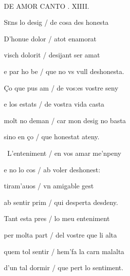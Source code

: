 \documentclass[12pt]{article}
\renewcommand{\espaiAbansEtiquetaPoema}{\vspace{0ex}}
\begin{document}
\begin{estrofa}

\espaiAbansEtiquetaPoema

\\

\begin{rubrica}

\pagina{[20v]} DE AMOR CANTO . XIIII.

\end{rubrica}

\end{estrofa}


\begin{estrofa}

 S\textsc{e}ns lo desig / de cosa des honesta

 D'honue dolor / atot enamorat

 visch dolorit / desijant ser amat

 e par ho be / que no vs vull deshonesta.

 \c{C}o que pus am / de vos:es vostre seny

 e los estats / de vostra vida casta

 molt no deman / car mon desig no basta

 sino en \c{c}o / que honestat ateny.

\end{estrofa}



\begin{estrofa}

 \textparagraph\  L'enteniment / en vos amar me'npeny

 e no lo cos / ab voler deshonest:

 tiram'auos / vn amigable gest

 ab sentir prim / qui desperta desdeny.

 Tant esta pres / lo meu enteniment

 per molta part / del vostre que li alta

 quem tol sentir / hem'fa la carn malalta

 d'un tal dormir / que pert lo sentiment.

\end{estrofa}
\end{document}
